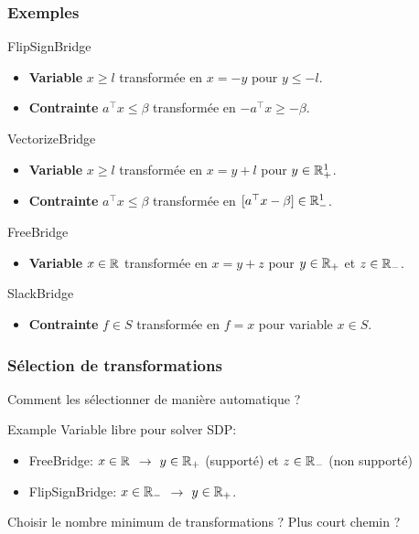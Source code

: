 \documentclass{beamer}
\begin{document}
  \begin{frame}
    \frametitle{Exemples}
    \begin{block}{FlipSignBridge}
      \begin{itemize}
        \item \textbf{Variable} $x \ge l$ transformée en $x = -y$ pour $y \le -l$.
        \item \textbf{Contrainte} $a^\top x \le \beta$ transformée en $-a^\top x \ge -\beta$.
      \end{itemize}
    \end{block}
    \begin{block}{VectorizeBridge}
      \begin{itemize}
        \item \textbf{Variable} $x \ge l$ transformée en $x = y + l$ pour $y \in \mathbb{R}^1_+$.
        \item \textbf{Contrainte} $a^\top x \le \beta$ transformée en $[a^\top x - \beta] \in \mathbb{R}^1_-$.
      \end{itemize}
    \end{block}
    \begin{block}{FreeBridge}
      \begin{itemize}
        \item \textbf{Variable} $x \in \mathbb{R}$ transformée en $x = y + z$ pour $y \in \mathbb{R}_+$ et $z \in \mathbb{R}_-$.
      \end{itemize}
    \end{block}
    \begin{block}{SlackBridge}
      \begin{itemize}
        \item \textbf{Contrainte} $f \in S$ transformée en $f = x$ pour variable $x \in S$.
      \end{itemize}
    \end{block}
  \end{frame}

\begin{frame}
  \frametitle{Sélection de transformations}
  Comment les sélectionner de manière automatique ?

  \begin{block}{Example}
    Variable libre pour solver SDP:
    \begin{itemize}
      \item FreeBridge: $x \in \mathbb{R}$ $\to$ $y \in \mathbb{R}_+$ (supporté) et $z \in \mathbb{R}_-$ (\alert{non} supporté)
      \item FlipSignBridge: $x \in \mathbb{R}_-$ $\to$ $y \in \mathbb{R}_+$.
    \end{itemize}
  \end{block}

  Choisir le \alert{nombre} minimum de transformations ? Plus court chemin ?
\end{frame}
\end{document}
